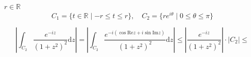 \documentclass[12pt,b5paper]{ltjsarticle}
\begin{document}
$r\in\mathbb{R}$
\begin{equation}
 C_{1} = \{ t\in\mathbb{R} \mid -r\leq t \leq r \}
 ,\quad
 C_{2} = \{ re^{i\theta} \mid 0 \leq \theta \leq \pi \}
\end{equation}


\begin{equation}
 \left|
 \int_{C_{2}}
  \frac{e^{-iz}}{(1+z^{2})^{2}} \mathrm{d}z
       \right|
 =
 \left|
 \int_{C_{2}}
  \frac{e^{-i(\cos{\mathrm{Re}z}+i\sin{\mathrm{Im}z})}}{(1+z^{2})^{2}} \mathrm{d}z
       \right|
 \leq
 \left\lvert \frac{e^{-iz}}{(1+z^{2})^{2}} \right| \cdot
 \left\lvert C_{2} \right\rvert
 \leq 
\end{equation}


\hrulefill
\end{document}
